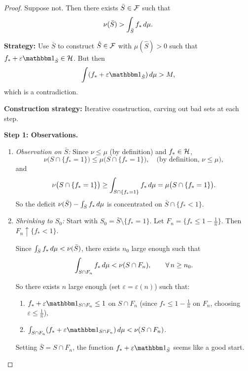 \begin{proof}
Suppose not. Then there exists $\bar{S} \in \mathcal{F}$ such that
\[
    \nu(\bar{S}) > \int_{\bar{S}} f_* \,d\mu.
\]

\noindent\textbf{Strategy:} Use $\bar{S}$ to construct $\hat{S} \in \mathcal{F}$ with $\mu(\hat{S}) > 0$ such that $f_* + \varepsilon \ind_{\hat{S}} \in \cH$.
But then
\[
    \int (f_* + \varepsilon \ind_{\hat{S}}) \dmu > M,
\]
which is a contradiction.

\medskip
\noindent\textbf{Construction strategy:} Iterative construction, carving out bad sets at each step.

\bigskip
\noindent\textbf{Step 1: Observations.}

\begin{enumerate}[label=(\roman*)]
    \item \emph{Observation on $\bar{S}$:}
    Since $\nu \leq \mu$ (by definition) and $f_* \in \mathcal{H}$,
    \[
        \nu\bigl(S \cap \{f_* = 1\}\bigr) \leq \mu\bigl(S \cap \{f_* = 1\}\bigr), \quad \text{(by definition, } \nu \leq \mu\text{)},
    \]
    and
    \[
        \nu\bigl(S \cap \{f_* = 1\}\bigr) \geq \int_{S \cap \{f_* = 1\}} f_* \,d\mu = \mu\bigl(S \cap \{f_* = 1\}\bigr).
    \]
    So the deficit $\nu(\bar{S}) - \int_{\bar{S}} f_* \,d\mu$ is concentrated on $\bar{S} \cap \{f_* < 1\}$.

    \item \emph{Shrinking to $S_0$:}
    Start with $S_0 = \bar{S} \setminus \{f_* = 1\}$.
    Let $F_n = \{f_* \leq 1 - \tfrac{1}{n}\}$. Then $F_n \uparrow \{f_* < 1\}$.

    Since $\int_{\bar{S}} f_* \,d\mu < \nu(\bar{S})$, there exists $n_0$ large enough such that
    \[
        \int_{S \cap F_n} f_* \,d\mu < \nu(S \cap F_n), \qquad \forall\, n \geq n_0.
    \]

    So there exists $n$ large enough (set $\varepsilon = \varepsilon(n)$) such that:
    \begin{enumerate}[label=(\alph*)]
        \item $f_* + \varepsilon \ind_{S \cap F_n} \leq 1$ on $S \cap F_n$ (since $f_* \leq 1 - \tfrac{1}{n}$ on $F_n$, choosing $\varepsilon \leq \tfrac{1}{n}$),
        \item $\int_{S \cap F_n} (f_* + \varepsilon \ind_{S \cap F_n}) \dmu < \nu(S \cap F_n)$.
    \end{enumerate}

    Setting $\bar{S} = S \cap F_n$, the function $f_* + \varepsilon \ind_{\bar{S}}$ seems like a good start.


\end{enumerate}
\end{proof}
